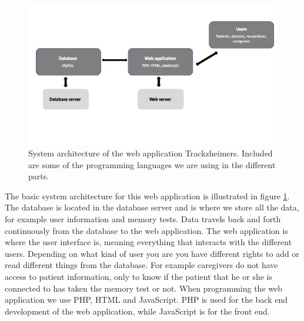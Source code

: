 \documentclass{article}
\begin{document}
\begin{figure}
    \centering
    \includegraphics[scale=0.5]{report/System_arch.jpg}
    \caption{System architecture of the web application Trackzheimers. Included are some of the programming languages we are using in the different parts. }
    \label{fig:system_arch}
\end{figure}

The basic system architecture for this web application is illustrated in figure \ref{fig:system_arch}. The database is located in the database server and is where we store all the data, for example user information and memory tests. Data travels back and forth continuously from the database to the web application. The web application is where the user interface is, meaning everything that interacts with the different users. Depending on what kind of user you are you have different rights to add or read different things from the database. For example caregivers do not have access to patient information, only to know if the patient that he or she is connected to has taken the memory test or not. When programming the web application we use PHP, HTML and JavaScript. PHP is used for the back end development of the web application, while JavaScript is for the front end. 
\end{document}

